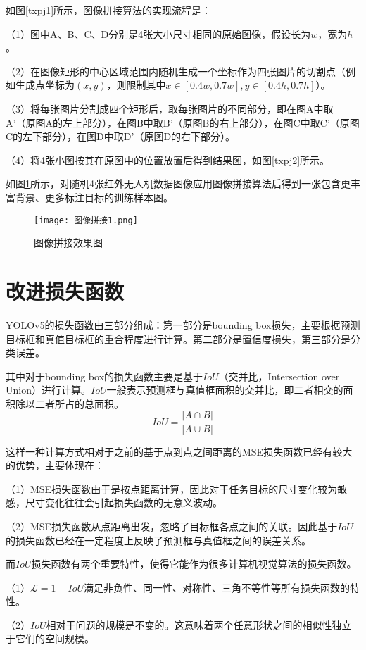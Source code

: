 如图\ref{txpj1}所示，图像拼接算法的实现流程是：

（1）图中A、B、C、D分别是4张大小尺寸相同的原始图像，假设长为$w$，宽为$h$。

（2）在图像矩形的中心区域范围内随机生成一个坐标作为四张图片的切割点（例如生成点坐标为$(x,y)$，则限制其中$x\in[0.4w,0.7w],y\in[0.4h,0.7h]$）。

（3）将每张图片分割成四个矩形后，取每张图片的不同部分，即在图A中取A'（原图A的左上部分），在图B中取B'（原图B的右上部分），在图C中取C'（原图C的左下部分），在图D中取D'（原图D的右下部分）。

（4）将4张小图按其在原图中的位置放置后得到结果图，如图\ref{txpj2}所示。

如图\ref{txpj}所示，对随机4张红外无人机数据图像应用图像拼接算法后得到一张包含更丰富背景、更多标注目标的训练样本图。

\begin{figure}[htpb]
  \centering
  \texttt{[image: 图像拼接1.png]}
  \caption{图像拼接效果图}
  \label{txpj}
\end{figure}

\section{改进损失函数}
YOLOv5的损失函数由三部分组成：第一部分是bounding box损失，主要根据预测目标框和真值目标框的重合程度进行计算。第二部分是置信度损失，第三部分是分类误差。

其中对于bounding box的损失函数主要是基于$IoU$（交并比，Intersection over Union）进行计算。$IoU$一般表示预测框与真值框面积的交并比，即二者相交的面积除以二者所占的总面积。
\begin{equation}
  I o U=\frac{|A \cap B|}{|A \cup B|}
\end{equation}

这样一种计算方式相对于之前的基于点到点之间距离的MSE损失函数已经有较大的优势，主要体现在：

（1）MSE损失函数由于是按点距离计算，因此对于任务目标的尺寸变化较为敏感，尺寸变化往往会引起损失函数的无意义波动。

（2）MSE损失函数从点距离出发，忽略了目标框各点之间的关联。因此基于$IoU$的损失函数已经在一定程度上反映了预测框与真值框之间的误差关系。

而$IoU$损失函数有两个重要特性，使得它能作为很多计算机视觉算法的损失函数。

（1）$\mathcal{L}=1-IoU$满足非负性、同一性、对称性、三角不等性等所有损失函数的特性。

（2）$IoU$相对于问题的规模是不变的。这意味着两个任意形状之间的相似性独立于它们的空间规模。

